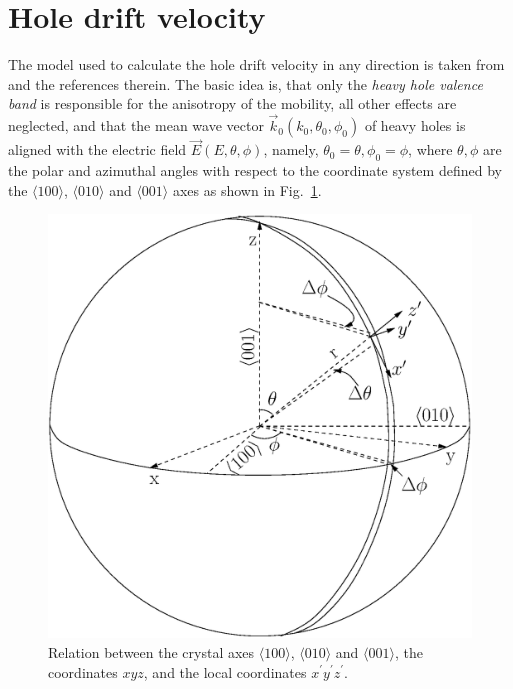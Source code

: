 \documentclass[epj,referee]{svjour}
\begin{document}
\section{Hole drift velocity} 
\label{s:hole} 
The model used to calculate the hole drift velocity in any direction
is taken from \cite{bart} and the references therein. The basic idea
is, that only the \emph{heavy hole valence band} \cite{heavy} is
responsible for the anisotropy of the mobility, all other effects are
neglected, and that the mean wave vector $\vec{k}_{0}(k_{0},
\theta_{0}, \phi_{0})$ of heavy holes is aligned with the electric
field $\vec{E}(E, \theta, \phi)$, namely, $\theta_{0} = \theta,
\phi_{0} = \phi$, where $\theta, \phi$ are the polar and azimuthal
angles with respect to the coordinate system defined by the $\langle
100 \rangle$, $\langle 010 \rangle$ and $\langle 001 \rangle$ axes as
shown in Fig.~\ref{f:vsphere}.

\begin{figure}[htpb]
\centering
\includegraphics[width=0.8\linewidth]{vsphere}   
\caption{Relation between the crystal axes $\langle 100 \rangle$,
$\langle 010 \rangle$ and $\langle 001 \rangle$, the coordinates
$xyz$, and the local coordinates $x^{\prime} y^{\prime} z^{\prime}$.}
\label{f:vsphere} 
\end{figure} 
\end{document}
